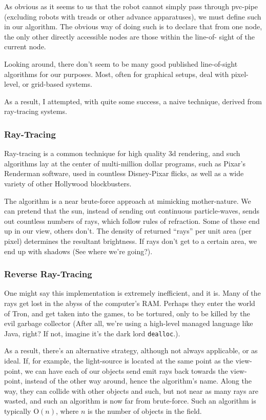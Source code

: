 \documentclass[letterpaper, 12pt]{article}
\begin{document}
\begin{multicols}{2}
As obvious as it seems to us that the robot cannot simply pass through pvc-pipe
(excluding robots with treads or other advance apparatuses), we must define such
in our algorithm. The obvious way of doing such is to declare that from one
node, the only other directly accessible nodes are those within the line-of-
sight of the current node.

Looking around, there don't seem to be many good published line-of-sight
algorithms for our purposes. Most, often for graphical setups, deal with pixel-
level, or grid-based systems.

As a result, I attempted, with quite some success, a naive technique, derived
from ray-tracing systems.

\subsubsection{Ray-Tracing}

Ray-tracing is a common technique for high quality 3d rendering, and such
algorithms lay at the center of multi-million dollar programs, such as Pixar's
Renderman software, used in countless Disney-Pixar flicks, as well as a wide
variety of other Hollywood blockbusters.

The algorithm is a near brute-force approach at mimicking mother-nature. We can
pretend that the sun, instead of sending out continuous particle-waves, sends
out countless numbers of rays, which follow rules of refraction. Some of these
end up in our view, others don't. The density of returned ``rays'' per unit area
(per pixel) determines the resultant brightness. If rays don't get to a certain
area, we end up with shadows (See where we're going?).

\subsubsection{Reverse Ray-Tracing}

One might say this implementation is extremely inefficient, and it is. Many of
the rays get lost in the abyss of the computer's RAM. Perhaps they enter the
world of Tron, and get taken into the games, to be tortured, only to be killed
by the evil garbage collector (After all, we're using a high-level managed
language like Java, right? If not, imagine it's the dark lord
\texttt{dealloc}.).

As a result, there's an alternative strategy, although not always applicable, or
as ideal. If, for example, the light-source is located at the same point as the
view-point, we can have each of our objects send emit rays back towards the
view-point, instead of the other way around, hence the algorithm's name. Along
the way, they can collide with other objects and such, but not near as many rays
are wasted, and such an algorithm is now far from brute-force. Such an algorithm
is typically \(\mathrm{O}(n)\), where \(n\) is the number of objects in the
field.


\end{multicols}
\end{document}
